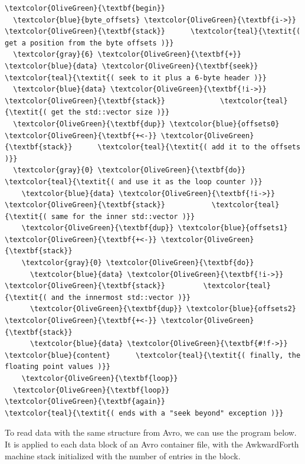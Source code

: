 \documentclass{webofc}
\begin{document}
\begin{Verbatim}[commandchars=\\\{\}]
\textcolor{OliveGreen}{\textbf{begin}}
  \textcolor{blue}{byte_offsets} \textcolor{OliveGreen}{\textbf{i->}} \textcolor{OliveGreen}{\textbf{stack}}      \textcolor{teal}{\textit{( get a position from the byte offsets )}}
  \textcolor{gray}{6} \textcolor{OliveGreen}{\textbf{+}} \textcolor{blue}{data} \textcolor{OliveGreen}{\textbf{seek}}               \textcolor{teal}{\textit{( seek to it plus a 6-byte header )}}
  \textcolor{blue}{data} \textcolor{OliveGreen}{\textbf{!i->}} \textcolor{OliveGreen}{\textbf{stack}}             \textcolor{teal}{\textit{( get the std::vector size )}}
  \textcolor{OliveGreen}{\textbf{dup}} \textcolor{blue}{offsets0} \textcolor{OliveGreen}{\textbf{+<-}} \textcolor{OliveGreen}{\textbf{stack}}      \textcolor{teal}{\textit{( add it to the offsets )}}
  \textcolor{gray}{0} \textcolor{OliveGreen}{\textbf{do}}                        \textcolor{teal}{\textit{( and use it as the loop counter )}}
    \textcolor{blue}{data} \textcolor{OliveGreen}{\textbf{!i->}} \textcolor{OliveGreen}{\textbf{stack}}           \textcolor{teal}{\textit{( same for the inner std::vector )}}
    \textcolor{OliveGreen}{\textbf{dup}} \textcolor{blue}{offsets1} \textcolor{OliveGreen}{\textbf{+<-}} \textcolor{OliveGreen}{\textbf{stack}}
    \textcolor{gray}{0} \textcolor{OliveGreen}{\textbf{do}}
      \textcolor{blue}{data} \textcolor{OliveGreen}{\textbf{!i->}} \textcolor{OliveGreen}{\textbf{stack}}         \textcolor{teal}{\textit{( and the innermost std::vector )}}
      \textcolor{OliveGreen}{\textbf{dup}} \textcolor{blue}{offsets2} \textcolor{OliveGreen}{\textbf{+<-}} \textcolor{OliveGreen}{\textbf{stack}}
      \textcolor{blue}{data} \textcolor{OliveGreen}{\textbf{#!f->}} \textcolor{blue}{content}      \textcolor{teal}{\textit{( finally, the floating point values )}}
    \textcolor{OliveGreen}{\textbf{loop}}
  \textcolor{OliveGreen}{\textbf{loop}}
\textcolor{OliveGreen}{\textbf{again}}                         \textcolor{teal}{\textit{( ends with a "seek beyond" exception )}}
\end{Verbatim}

\noindent To read data with the same structure from Avro, we can use the program below. It is applied to each data block of an Avro container file, with the AwkwardForth machine stack initialized with the number of entries in the block.
\end{document}
